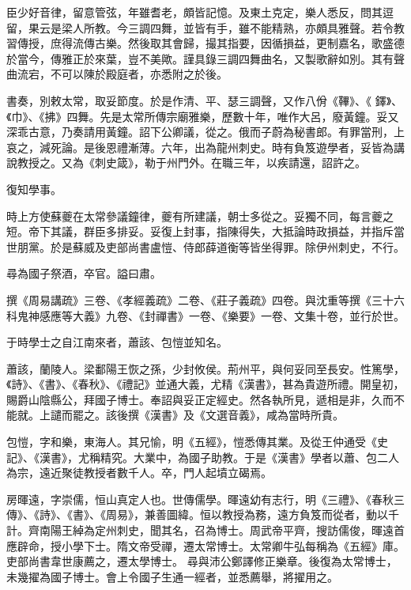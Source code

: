 \begin{pinyinscope}
 臣少好音律，留意管弦，年雖耆老，頗皆記憶。及東土克定，樂人悉反，問其逗留，果云是梁人所教。今三調四舞，並皆有手，雖不能精熟，亦頗具雅聲。若令教習傳授，庶得流傳古樂。然後取其會歸，撮其指要，因循損益，更制嘉名，歌盛德於當今，傳雅正於來葉，豈不美歟。謹具錄三調四舞曲名，又製歌辭如別。其有聲曲流宕，不可以陳於殿庭者，亦悉附之於後。



 書奏，別敕太常，取妥節度。於是作清、平、瑟三調聲，又作八佾《鞸》、《
 鐸》、《巾》、《拂》四舞。先是太常所傳宗廟雅樂，歷數十年，唯作大呂，廢黃鐘。妥又深乖古意，乃奏請用黃鐘。詔下公卿議，從之。俄而子蔚為秘書郎。有罪當刑，上哀之，減死論。是後恩禮漸薄。六年，出為龍州刺史。時有負笈遊學者，妥皆為講說教授之。又為《刺史箴》，勒于州門外。在職三年，以疾請還，詔許之。



 復知學事。



 時上方使蘇夔在太常參議鐘律，夔有所建議，朝士多從之。妥獨不同，每言夔之短。帝下其議，群臣多排妥。妥復上封事，指陳得失，大抵論時政損益，并指斥當世朋黨。於是蘇威及吏部尚書盧愷、侍郎薛道衡等皆坐得罪。除伊州刺史，不行。



 尋為國子祭酒，卒官。謚曰肅。



 撰《周易講疏》三卷、《孝經義疏》二卷、《莊子義疏》四卷。與沈重等撰《三十六科鬼神感應等大義》九卷、《封禪書》一卷、《樂要》一卷、文集十卷，並行於世。



 于時學士之自江南來者，蕭該、包愷並知名。



 蕭該，蘭陵人。梁鄱陽王恢之孫，少封攸侯。荊州平，與何妥同至長安。性篤學，《詩》、《書》、《春秋》、《禮記》並通大義，尤精《漢書》，甚為貴遊所禮。開皇初，賜爵山陰縣公，拜國子博士。奉詔與妥正定經史。然各執所見，遞相是非，久而不能就。上譴而罷之。該後撰《漢書》及《文選音義》，咸為當時所貴。



 包愷，字和樂，東海人。其兄愉，明《五經》，愷悉傳其業。及從王仲通受《史記》、《漢書》，尤稱精究。大業中，為國子助教。于是《漢書》學者以蕭、包二人為宗，遠近聚徒教授者數千人。卒，門人起墳立碣焉。



 房暉遠，字崇儒，恒山真定人也。世傳儒學。暉遠幼有志行，明《三禮》、《春秋三傳》、《詩》、《書》、《周易》，兼善圖緯。恒以教授為務，遠方負笈而從者，動以千計。齊南陽王綽為定州刺史，聞其名，召為博士。周武帝平齊，搜訪儒俊，暉遠首應辟命，授小學下士。隋文帝受禪，遷太常博士。太常卿牛弘每稱為《五經》庫。吏部尚書韋世康薦之，遷太學博士。
 尋與沛公鄭譯修正樂章。後復為太常博士，未幾擢為國子博士。會上令國子生通一經者，並悉薦舉，將擢用之。




\end{pinyinscope}

